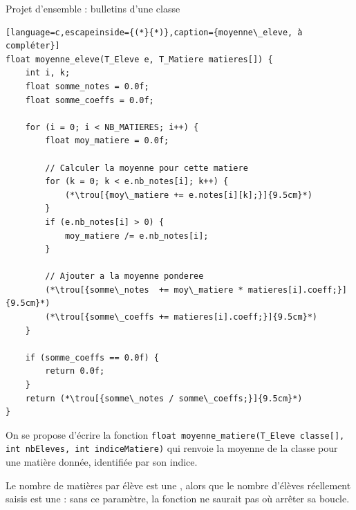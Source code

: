 \begin{UPSTIexercice}{Projet d'ensemble : bulletins d'une classe}

    \begin{lstlisting}[language=c,escapeinside={(*}{*)},caption={moyenne\_eleve, à compléter}]
float moyenne_eleve(T_Eleve e, T_Matiere matieres[]) {
    int i, k;
    float somme_notes = 0.0f;
    float somme_coeffs = 0.0f;

    for (i = 0; i < NB_MATIERES; i++) {
        float moy_matiere = 0.0f;

        // Calculer la moyenne pour cette matiere
        for (k = 0; k < e.nb_notes[i]; k++) {
            (*\trou[{moy\_matiere += e.notes[i][k];}]{9.5cm}*)
        }
        if (e.nb_notes[i] > 0) {
            moy_matiere /= e.nb_notes[i];
        }

        // Ajouter a la moyenne ponderee
        (*\trou[{somme\_notes  += moy\_matiere * matieres[i].coeff;}]{9.5cm}*)
        (*\trou[{somme\_coeffs += matieres[i].coeff;}]{9.5cm}*)
    }

    if (somme_coeffs == 0.0f) {
        return 0.0f;
    }
    return (*\trou[{somme\_notes / somme\_coeffs;}]{9.5cm}*)
}
\end{lstlisting}

    On se propose d'écrire la fonction \texttt{float moyenne\_matiere(T\_Eleve classe[], int nbEleves, int indiceMatiere)} qui renvoie la moyenne de la classe pour une matière donnée, identifiée par son indice.


    Le nombre de matières par élève est une ,
    alors que le nombre d'élèves réellement saisis est une  :
    sans ce paramètre, la fonction ne saurait pas où arrêter sa boucle.



\end{UPSTIexercice}
